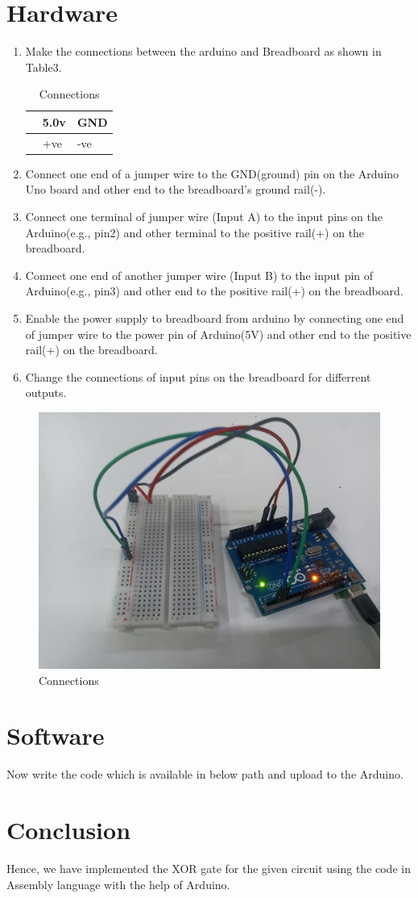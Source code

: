 \documentclass[10pt,a4paper]{article}
\begin{document}
     \section{Hardware}
	     \begin{enumerate}
		     \item Make the connections between the arduino and Breadboard as shown in Table3.
			     \begin{table}[h]
				     \centering
				     \begin{tabularx}{0.5\textwidth}
					     {
						     | >{\centering\arraybackslash}X
						     | >{\centering\arraybackslash}X
						     | >{\centering\arraybackslash}X |}
						     \hline
						     {\bf Arduino} & 5.0v & GND \\
						     \hline
						     {\bf Breadboard} & +ve & -ve  \\
						     \hline
				     \end{tabularx}
				     \caption{\label{Table-3}Connections}
			     \end{table}
		\item Connect one end of a jumper wire to the GND(ground) pin on the Arduino Uno board and other end to the breadboard’s ground rail(-).
                \item Connect one terminal of jumper wire (Input A) to the input pins on the Arduino(e.g., pin2) and other terminal to the positive rail(+) on the breadboard.
		\item Connect one end of another jumper wire (Input B) to the input pin of Arduino(e.g., pin3) and other end to the positive rail(+) on the breadboard.
		\item Enable the power supply to breadboard from arduino by connecting one end of jumper wire to the power pin of Arduino(5V) and other end to the positive rail(+) on the breadboard.
		\item Change the connections of input pins on the breadboard for differrent outputs. 
	     \end{enumerate}
	     \begin{figure}[H]
		     \centering
		     \includegraphics[width=0.3\columnwidth]{assembly.jpg}
		     \caption{Connections}
		     \label{fig:connections}
	     \end{figure}
     \section{Software}
	     Now write the code which is available in below path and upload to the Arduino.\\
	     \section{Conclusion}
	     Hence, we have implemented the XOR gate for the given circuit using the code in Assembly language with the help of Arduino.
\end{document}
